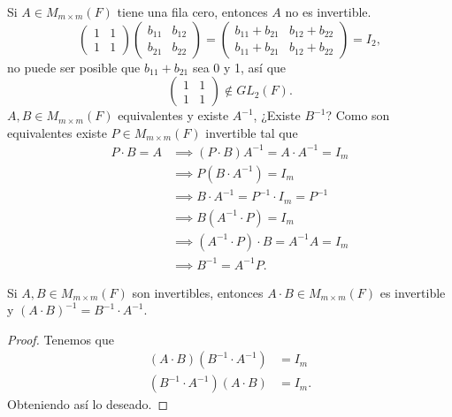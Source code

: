 \documentclass[12pt,a4paper]{book}
\begin{document}
    Si $A\in M_{m\times m}(F)$ tiene una fila cero, entonces $A$ no es invertible.
    \begin{equation*}
        \begin{pmatrix}
            1 & 1\\
            1 & 1
        \end{pmatrix}
        \begin{pmatrix}
            b_{11} & b_{12}\\
            b_{21} & b_{22}
        \end{pmatrix}
        =
        \begin{pmatrix}
            b_{11}+b_{21} & b_{12}+b_{22}\\
            b_{11}+b_{21} & b_{12}+b_{22}
        \end{pmatrix}
        =I_{2},
    \end{equation*}
    no puede ser posible que $b_{11}+b_{21}$ sea 0 y 1, así que
    \begin{equation*}
        \begin{pmatrix}
            1 & 1\\
            1 & 1
        \end{pmatrix}
        \notin GL_{2}(F).
    \end{equation*}
    $A,B\in M_{m\times m}(F)$ equivalentes y existe $A^{-1}$, ¿Existe $B^{-1}$?
    Como son equivalentes existe $P\in M_{m\times m}(F)$ invertible tal que
    \begin{align*}
        P\cdot B=A&\implies (P\cdot B)A^{-1}=A\cdot A^{-1}=I_{m}\\
        &\implies P(B\cdot A^{-1})=I_{m}\\
        &\implies B\cdot A^{-1}=P^{-1}\cdot I_{m}=P^{-1}\\
        &\implies B(A^{-1}\cdot P)=I_{m}\\
        &\implies (A^{-1}\cdot P)\cdot B=A^{-1}A=I_{m}\\
        &\implies B^{-1}=A^{-1}P.
    \end{align*}

    \begin{lema}
    \label{lema:1}
        Si $A,B\in M_{m\times m}(F)$ son invertibles, entonces $A\cdot B\in M_{m\times m}(F)$
        es invertible y $(A\cdot B)^{-1}=B^{-1}\cdot A^{-1}$.
    \end{lema}
    
    \begin{proof}
        Tenemos que
        \begin{align*}
            (A\cdot B)(B^{-1}\cdot A^{-1})&=I_{m}\\
            (B^{-1}\cdot A^{-1})(A\cdot B)&=I_{m}.
        \end{align*}
        Obteniendo así lo deseado.
    \end{proof}
\end{document}
